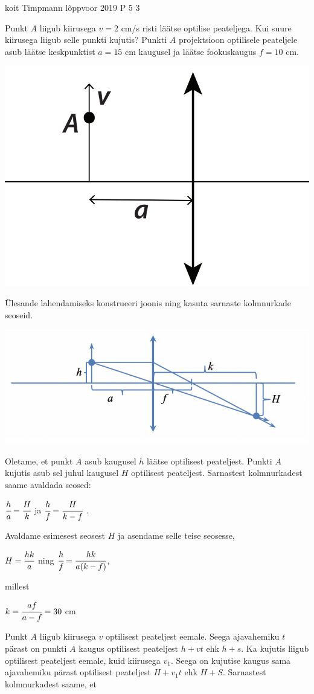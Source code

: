 {koit Timpmann} %
{lõppvoor} %
{2019} %
{P 5} %
{3} %
{
\ifStatement
Punkt $A$ liigub kiirusega $v = 2$ cm/s risti läätse optilise peateljega. Kui suure kiirusega liigub selle punkti kujutis? Punkti $A$ projektsioon optilisele peateljele asub läätse keskpunktist $a = 15$ cm kaugusel ja läätse fookuskaugus $f = 10$ cm.
\begin{center}
	\includegraphics[width=0.5\linewidth]{2019-v3p-05-yl.PNG}
\end{center}
\fi
\ifHint
Ülesande lahendamiseks konstrueeri joonis ning kasuta sarnaste kolmnurkade seoseid.
\fi
\ifSolution
\begin{center}
	\includegraphics[width=0.5\linewidth]{2019-v3p-05-lah.PNG}
\end{center}
Oletame, et punkt $A$ asub kaugusel $h$ läätse optilisest peateljest. Punkti $A$ kujutis asub sel juhul kaugusel $H$ optilisest peateljest. Sarnastest kolmnurkadest saame avaldada seosed:
\begin{center}
$\cfrac{h}{a} = \cfrac{H}{k}$ ja $\cfrac{h}{f} = \cfrac{H}{k - f}$ .
\end{center}
Avaldame esimesest seosest $H$ ja asendame selle teise seosesse,
\begin{center}
$H = \cfrac{hk}{a}$ ning $\cfrac{h}{f} = \cfrac{hk}{a(k - f)}$, 
\end{center}
millest
\begin{center}
$k = \cfrac{af}{a - f} = 30$ cm 
\end{center}
Punkt $A$ liigub kiirusega $v$ optilisest peateljest eemale. Seega ajavahemiku $t$ pärast on punkti $A$ kaugus optilisest peateljest $h + vt$ ehk $h + s$. Ka kujutis liigub optilisest peateljest eemale, kuid kiirusega $v_1$. Seega on kujutise kaugus sama ajavahemiku pärast optilisest peateljest $H + v_1t$ ehk  $H + S$. Sarnastest kolmnurkadest saame, et
}
